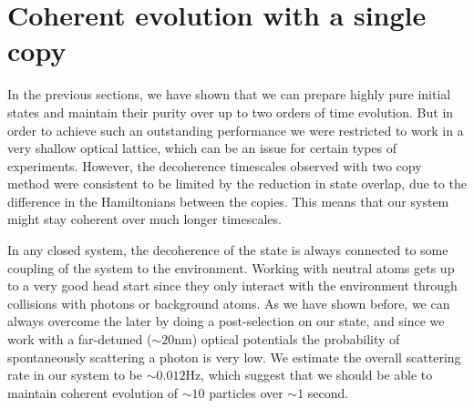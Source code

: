 \section{Coherent evolution with a single copy}
In the previous sections, we have shown that we can prepare highly pure initial states and maintain their purity over up to two orders of time evolution. But in order to achieve such an outstanding performance we were restricted to work in a very shallow optical lattice, which can be an issue for certain types of experiments. However, the decoherence timescales observed with two copy method were consistent to be limited by the reduction in state overlap, due to the difference in the Hamiltonians between the copies. This means that our system might stay coherent over much longer timescales.

In any closed system, the decoherence of the state is always connected to some coupling of the system to the environment. Working with neutral atoms gets up to a very good head start since they only interact with the environment through collisions with photons or background atoms. As we have shown before, we can always overcome the later by doing a post-selection on our state, and since we work with a far-detuned ($\sim 20 \mathrm{nm}$) optical potentials the probability of spontaneously scattering a photon is very low. We estimate the overall scattering rate in our system to be $\sim 0.012 \mathrm{Hz}$, which suggest that we should be able to maintain coherent evolution of $\sim 10$ particles over $\sim 1$ second.

